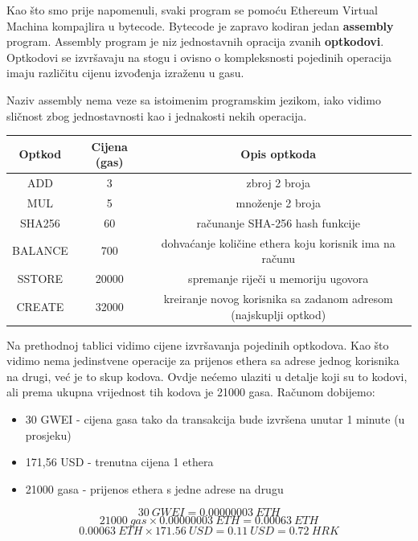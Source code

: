 \documentclass[a4paper,oneside,12pt]{memoir} %
\begin{document}
\newpage

Kao što smo prije napomenuli, svaki program se pomoću Ethereum Virtual Machina kompajlira u bytecode. Bytecode je zapravo kodiran jedan \textbf{assembly} program. Assembly program je niz jednostavnih opracija zvanih \textbf{optkodovi}. Optkodovi se izvršavaju na stogu i ovisno o kompleksnosti pojedinih operacija imaju različitu cijenu izvođenja izraženu u gasu. 

\begin{napomena}
Naziv assembly nema veze sa istoimenim programskim jezikom, iako vidimo sličnost zbog jednostavnosti kao i jednakosti nekih operacija.
\end{napomena}

\begin{center}
\begin{tabular}{c|c|c}
     Optkod & Cijena (gas) & Opis optkoda \\
     \hline
     ADD & 3 & zbroj 2 broja \\ \hline
     MUL & 5 & množenje 2 broja \\ \hline
     SHA256 & 60 & računanje SHA-256 hash funkcije \\ \hline
     BALANCE & 700 & dohvaćanje količine ethera koju korisnik ima na računu \\ \hline
     SSTORE & 20000 & spremanje riječi u memoriju ugovora \\ \hline
     CREATE & 32000 & kreiranje novog korisnika sa zadanom adresom (najskuplji optkod)
    
\end{tabular}
\end{center}

Na prethodnoj tablici vidimo cijene izvršavanja pojedinih optkodova. Kao što vidimo nema jedinstvene operacije za prijenos ethera sa adrese jednog korisnika na drugi, već je to skup kodova. Ovdje nećemo ulaziti u detalje koji su to kodovi, ali prema \cite{wood2014ethereum} ukupna vrijednost tih kodova je 21000 gasa. Računom dobijemo:

\begin{itemize}
    \item 30 GWEI - cijena gasa tako da transakcija bude izvršena unutar 1 minute (u prosjeku)
    \item 171,56 USD - trenutna cijena 1 ethera
    \item 21000 gasa - prijenos ethera s jedne adrese na drugu
\end{itemize}

\begin{minipage}{\linewidth}
\begin{equation*}
    30\ GWEI = 0.00000003\ ETH
\end{equation*}
\begin{equation*}
    21 000\ gas \times 0.00000003\ ETH = 0.00063\ ETH
\end{equation*}
\begin{equation*}
    0.00063\ ETH \times 171.56\ USD = 0.11\ USD = 0.72\ HRK 
\end{equation*}
\hspace{0.5cm}
\end{minipage}
\end{document}
